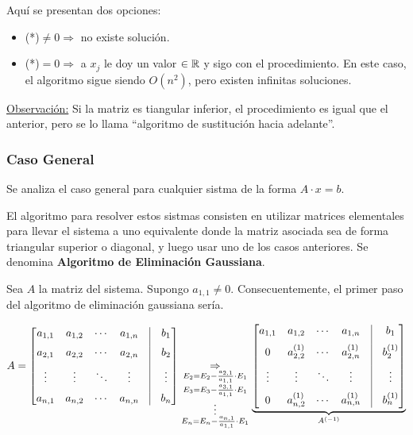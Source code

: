 \documentclass[]{article}
\begin{document}
\begin{itemize}
	Aquí se presentan dos opciones:
	\begin{itemize}
		\item (*)$ \neq 0 \Rightarrow$ no existe solución.
		\item (*)$=0 \Rightarrow$ a $x_j$ le doy un valor $\in \mathbb{R}$ y sigo con el procedimiento. En este caso, el algoritmo sigue siendo $O(n^2)$, pero existen infinitas soluciones.
	\end{itemize}
\end{itemize}

\underline{Observación:} Si la matriz es tiangular inferior, el procedimiento es igual que el anterior, pero se lo llama ``algoritmo de sustitución hacia adelante''.

\subsubsection{Caso General}
Se analiza el caso general para cualquier sistma de la forma $A\cdot x = b$.

El algoritmo para resolver estos sistmas consisten en utilizar matrices elementales para llevar el sistema a uno equivalente donde la matriz asociada sea de forma triangular superior o diagonal, y luego usar uno de los casos anteriores. Se denomina \textbf{Algoritmo de Eliminación Gaussiana}.


Sea $A$ la matriz del sistema. Supongo $a_{1,1}\neq0$. Consecuentemente, el primer paso del algoritmo de eliminación gaussiana sería.
\begin{center}
	$A =
	\begin{bmatrix}
		a_{1,1} & a_{1,2} & \cdots & a_{1,n} & \vrule & b_1\\[6pt]
		a_{2,1} & a_{2,2} & \cdots & a_{2,n} & \vrule & b_2\\[6pt]
		\vdots & \vdots & \ddots & \vdots & \vrule & \vdots\\[6pt]
		a_{n,1} & a_{n,2} & \cdots & a_{n,n} & \vrule & b_n
	\end{bmatrix} \underset{\substack{E_2 = E_2 - \frac{a_{2,1}}{a_{1,1}}\cdot E_1 \\ E_3 = E_3 - \frac{a_{3,1}}{a_{1,1}}\cdot E_1 \\ \vdots \\ E_n = E_n - \frac{a_{n,1}}{a_{1,1}}\cdot E_1}}{\Rightarrow}
	\underbrace{\displaystyle \begin{bmatrix}
		a_{1,1} & a_{1,2} & \cdots & a_{1,n} & \vrule & b_1\\[6pt]
		0 & a_{2,2}^{(1)} & \cdots & a_{2,n}^{(1)} & \vrule & b_2^{(1)}\\[6pt]
		\vdots & \vdots & \ddots & \vdots & \vrule & \vdots\\[6pt]
		0 & a_{n,2}^{(1)} & \cdots & a_{n,n}^{(1)} & \vrule & b_n^{(1)}
	\end{bmatrix}}_{A^{(-1)} }
	$
\end{center}
\end{document}
